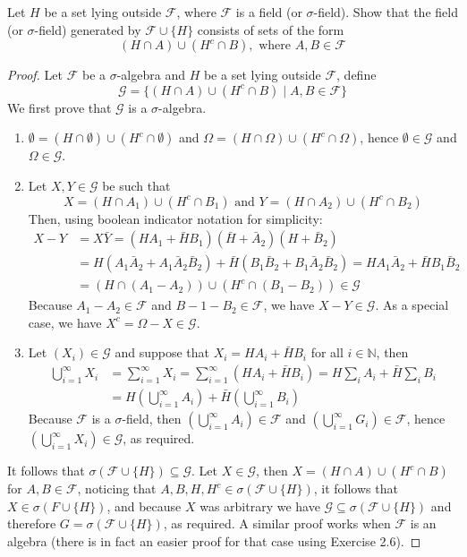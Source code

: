 \documentclass[11pt]{article}
\newcommand{\N}{\mathbb{N}}
\newcommand{\F}{\mathcal{F}}
\newcommand{\G}{\mathcal{G}}
\newcommand{\seq}{\subseteq}
\newcommand{\Om}{\Omega}
\newcommand{\es}{\emptyset}
\newcommand{\un}{\cup}
\newcommand{\ic}{\cap}
\newcommand{\Sum}{\sum\limits}
\newenvironment{exercise}[2][Exercise]{\begin{trivlist}
\item[\hskip \labelsep {\bfseries #1}\hskip \labelsep {\bfseries #2.}]}{\end{trivlist}}
\begin{document}
\begin{exercise}{2.7}
    Let $H$ be a set lying outside $\F$, where $\F$ is a field (or $\sigma$-field). Show that the field (or $\sigma$-field) generated by $\F \un \{ H \}$ consists of sets of the form
    \[ (H \ic A) \un (H^{c} \ic B), \text { where } A, B \in \F \]
\end{exercise}
\begin{proof}
    Let $\F$ be a $\sigma$-algebra and $H$ be a set lying outside $\F$, define
    \[ \G = \{ (H \ic A) \un (H^{c} \ic B) \mid A, B \in \F \} \]
    We first prove that $\G$ is a $\sigma$-algebra.
    \begin{enumerate}
        \item $\es = (H \ic \es) \un (H^{c} \ic \es)$ and $\Om = (H \ic \Om) \un (H^{c} \ic \Om)$, hence $\es \in \G$ and $\Om \in \G$.
        \item Let $X, Y \in \G$ be such that
        \[ X = (H \ic A_1) \un (H^{c} \ic B_1) \text{ and } Y = (H \ic A_2) \un (H^{c} \ic B_2) \]
        Then, using boolean indicator notation for simplicity:
        \begin{align*}
            X - Y &= X \bar{Y} = (H A_1 + \bar H B_1) (\bar H + \bar A_2) (H + \bar B_2) \\
            &= H(A_1 \bar A_2 + A_1 \bar A_2 \bar B_2) + \bar H (B_1 \bar B_2 + B_1 \bar A_2 \bar B_2) = H A_1 \bar A_2 + \bar H B_1 \bar B_2 \\
            &= (H \ic (A_1 - A_2)) \un (H^{c} \ic (B_1 - B_2)) \in \G
        \end{align*}
        Because $A_1 - A_2 \in \F$ and $B-1 - B_2 \in \F$, we have $X - Y \in \G$. As a special case, we have $X^{c} = \Om - X \in \G$.
        \item Let $(X_i) \in \G$ and suppose that $X_i = H A_i + \bar H B_i$ for all $i \in \N$, then
        \begin{align*}
            \bigcup_{i=1}^{\infty} X_i &= \Sum_{i=1}^{\infty} X_i = \Sum_{i=1}^{\infty} (H A_i + \bar H B_i) = H \Sum_{i} A_i + \bar H \Sum_{i} B_i \\
            &= H \left ( \bigcup_{i=1}^{\infty} A_i \right) + \bar{H} \left ( \bigcup_{i=1}^{\infty} B_i \right)
        \end{align*}
        Because $\F$ is a $\sigma$-field, then $\left ( \bigcup_{i=1}^{\infty} A_i \right) \in \F$ and $\left ( \bigcup_{i=1}^{\infty} G_i \right) \in \F$, hence $\left ( \bigcup_{i=1}^{\infty} X_i \right) \in \G$, as required.
    \end{enumerate}
    It follows that $\sigma(\F \un \{ H \}) \seq \G$. Let $X \in \G$, then $X = (H \ic A) \un (H^{c} \ic B)$ for $A, B \in \F$, noticing that $A, B, H, H^{c} \in \sigma (\F \un \{ H \})$, it follows that $X \in \sigma (F \un \{ H \})$, and because $X$ was arbitrary we have $\G \seq \sigma (\F \un \{ H \})$ and therefore $G = \sigma (\F \un \{ H \})$, as required. A similar proof works when $\F$ is an algebra (there is in fact an easier proof for that case using Exercise 2.6).
\end{proof}
\end{document}
